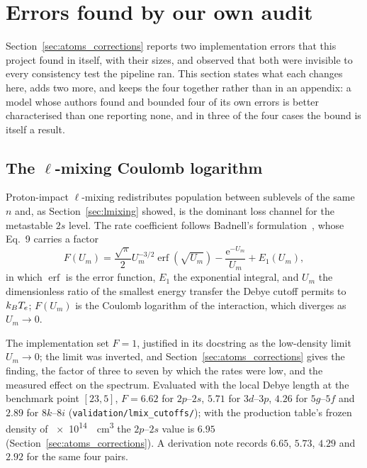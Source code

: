 \section{Errors found by our own audit}
\label{sec:errors_found}

Section~\ref{sec:atoms_corrections} reports two implementation errors that this
project found in itself, with their sizes, and observed that both were invisible
to every consistency test the pipeline ran. This section states what each
changes here, adds two more, and keeps the four together rather than in an
appendix: a model whose authors found and bounded four of its own errors is
better characterised than one reporting none, and in three of the four cases
the bound is itself a result.

\subsection{The $\ell$-mixing Coulomb logarithm}

Proton-impact $\ell$-mixing redistributes population between sublevels of the
same $n$ and, as Section~\ref{sec:lmixing} showed, is the dominant loss channel
for the metastable $2s$ level. The rate coefficient follows Badnell's
formulation~\cite{Badnell2021}, whose Eq.~9 carries a factor
\begin{equation}
  F(U_m) = \frac{\sqrt{\pi}}{2}U_m^{-3/2}\operatorname{erf}(\sqrt{U_m})
           - \frac{\mathrm{e}^{-U_m}}{U_m} + E_1(U_m),
  \label{eq:FUm}
\end{equation}
in which $\operatorname{erf}$ is the error function, $E_1$ the exponential
integral, and $U_m$ the dimensionless ratio of the smallest energy transfer the
Debye cutoff permits to $k_BT_e$; $F(U_m)$ is the Coulomb logarithm of the
interaction, which diverges as $U_m \to 0$.

The implementation set $F = 1$, justified in its docstring as the low-density
limit $U_m \to 0$; the limit was inverted, and
Section~\ref{sec:atoms_corrections} gives the finding, the factor of three to
seven by which the rates were low, and the measured effect on the spectrum.
Evaluated with the local Debye length at the benchmark point $[23,5]$,
$F = 6.62$ for $2p$--$2s$, $5.71$ for $3d$--$3p$, $4.26$ for $5g$--$5f$ and
$2.89$ for $8k$--$8i$ (\texttt{validation/lmix\_cutoffs/}); with the
production table's frozen density of \SI{e14}{\per\cubic\centi\metre} the
$2p$--$2s$ value is $6.95$ (Section~\ref{sec:atoms_corrections}). A derivation
note records $6.65$, $5.73$, $4.29$ and $2.92$ for the same four pairs.

